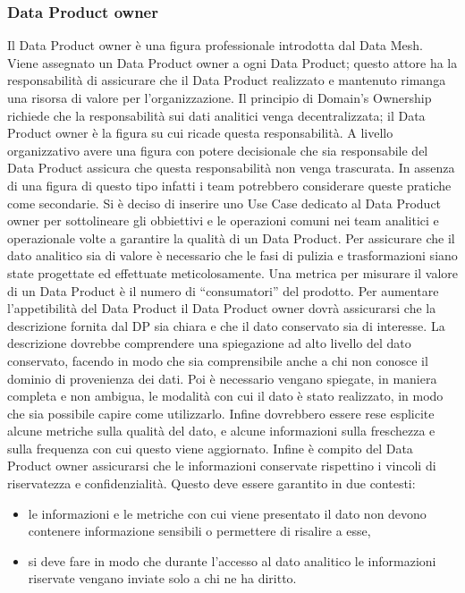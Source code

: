 \documentclass[a4paper,12pt]{report}
\begin{document}
\subsubsection{Data Product owner}
Il Data Product owner è una figura professionale introdotta dal Data Mesh.
Viene assegnato un Data Product owner a ogni Data Product; questo attore ha la responsabilità di assicurare che il Data Product realizzato e mantenuto rimanga una risorsa di valore per l'organizzazione. 
Il principio di Domain's Ownership richiede che la responsabilità sui dati analitici venga decentralizzata; il Data Product owner è la figura su cui ricade questa responsabilità.
A livello organizzativo avere una figura con potere decisionale che sia responsabile del Data Product assicura che questa responsabilità non venga trascurata.
In assenza di una figura di questo tipo infatti i team potrebbero considerare queste pratiche come secondarie.
Si è deciso di inserire uno Use Case dedicato al Data Product owner per sottolineare gli obbiettivi e le operazioni comuni nei team analitici e operazionale volte a garantire la qualità di un Data Product.
Per assicurare che il dato analitico sia di valore è necessario che le fasi di pulizia e trasformazioni siano state progettate ed  effettuate meticolosamente.
Una metrica per misurare il valore di un  Data Product è il numero di ``consumatori'' del prodotto.
Per aumentare l'appetibilità del Data Product il Data Product owner dovrà assicurarsi che la descrizione fornita dal DP sia chiara e che il dato conservato sia di interesse. 
La descrizione dovrebbe comprendere una spiegazione ad alto livello del dato conservato, facendo in modo che sia comprensibile anche a chi non conosce il dominio di provenienza dei dati.
Poi è necessario vengano spiegate, in maniera completa e non ambigua, le modalità con cui il dato è stato realizzato, in modo che sia possibile capire come utilizzarlo.
Infine dovrebbero essere rese esplicite alcune metriche sulla qualità del dato, e alcune informazioni sulla freschezza e sulla frequenza con cui questo viene aggiornato.
Infine è compito del Data Product owner assicurarsi che le informazioni conservate rispettino i vincoli di riservatezza e confidenzialità.
Questo deve essere garantito in due contesti:
\begin{itemize}
    \item le informazioni e le metriche con cui viene presentato il dato non devono contenere informazione sensibili o permettere di risalire a esse,
    \item si deve fare in modo che durante l'accesso al dato analitico le informazioni riservate vengano inviate solo a chi ne ha diritto.
\end{itemize}
\end{document}
